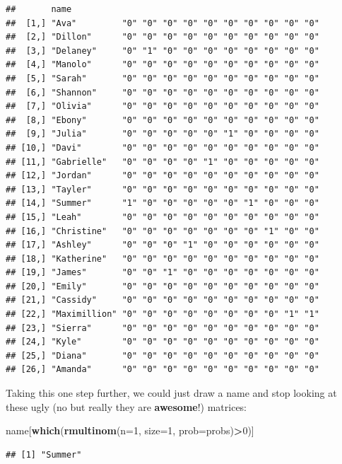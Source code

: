 \documentclass[
]{book}
\newenvironment{Shaded}{\begin{snugshade}}{\end{snugshade}}
\newcommand{\DataTypeTok}[1]{\textcolor[rgb]{0.13,0.29,0.53}{#1}}
\newcommand{\DecValTok}[1]{\textcolor[rgb]{0.00,0.00,0.81}{#1}}
\newcommand{\KeywordTok}[1]{\textcolor[rgb]{0.13,0.29,0.53}{\textbf{#1}}}
\newcommand{\NormalTok}[1]{#1}
\newcommand{\OperatorTok}[1]{\textcolor[rgb]{0.81,0.36,0.00}{\textbf{#1}}}
\begin{document}
\begin{verbatim}
##       name                                                 
##  [1,] "Ava"         "0" "0" "0" "0" "0" "0" "0" "0" "0" "0"
##  [2,] "Dillon"      "0" "0" "0" "0" "0" "0" "0" "0" "0" "0"
##  [3,] "Delaney"     "0" "1" "0" "0" "0" "0" "0" "0" "0" "0"
##  [4,] "Manolo"      "0" "0" "0" "0" "0" "0" "0" "0" "0" "0"
##  [5,] "Sarah"       "0" "0" "0" "0" "0" "0" "0" "0" "0" "0"
##  [6,] "Shannon"     "0" "0" "0" "0" "0" "0" "0" "0" "0" "0"
##  [7,] "Olivia"      "0" "0" "0" "0" "0" "0" "0" "0" "0" "0"
##  [8,] "Ebony"       "0" "0" "0" "0" "0" "0" "0" "0" "0" "0"
##  [9,] "Julia"       "0" "0" "0" "0" "0" "1" "0" "0" "0" "0"
## [10,] "Davi"        "0" "0" "0" "0" "0" "0" "0" "0" "0" "0"
## [11,] "Gabrielle"   "0" "0" "0" "0" "1" "0" "0" "0" "0" "0"
## [12,] "Jordan"      "0" "0" "0" "0" "0" "0" "0" "0" "0" "0"
## [13,] "Tayler"      "0" "0" "0" "0" "0" "0" "0" "0" "0" "0"
## [14,] "Summer"      "1" "0" "0" "0" "0" "0" "1" "0" "0" "0"
## [15,] "Leah"        "0" "0" "0" "0" "0" "0" "0" "0" "0" "0"
## [16,] "Christine"   "0" "0" "0" "0" "0" "0" "0" "1" "0" "0"
## [17,] "Ashley"      "0" "0" "0" "1" "0" "0" "0" "0" "0" "0"
## [18,] "Katherine"   "0" "0" "0" "0" "0" "0" "0" "0" "0" "0"
## [19,] "James"       "0" "0" "1" "0" "0" "0" "0" "0" "0" "0"
## [20,] "Emily"       "0" "0" "0" "0" "0" "0" "0" "0" "0" "0"
## [21,] "Cassidy"     "0" "0" "0" "0" "0" "0" "0" "0" "0" "0"
## [22,] "Maximillion" "0" "0" "0" "0" "0" "0" "0" "0" "1" "1"
## [23,] "Sierra"      "0" "0" "0" "0" "0" "0" "0" "0" "0" "0"
## [24,] "Kyle"        "0" "0" "0" "0" "0" "0" "0" "0" "0" "0"
## [25,] "Diana"       "0" "0" "0" "0" "0" "0" "0" "0" "0" "0"
## [26,] "Amanda"      "0" "0" "0" "0" "0" "0" "0" "0" "0" "0"
\end{verbatim}

Taking this one step further, we could just draw a name and stop looking at these ugly (no but really they are \textbf{awesome}!) matrices:

\begin{Shaded}
\begin{Highlighting}[]
\NormalTok{name[}\KeywordTok{which}\NormalTok{(}\KeywordTok{rmultinom}\NormalTok{(}\DataTypeTok{n=}\DecValTok{1}\NormalTok{, }\DataTypeTok{size=}\DecValTok{1}\NormalTok{, }\DataTypeTok{prob=}\NormalTok{probs)}\OperatorTok{>}\DecValTok{0}\NormalTok{)]}
\end{Highlighting}
\end{Shaded}

\begin{verbatim}
## [1] "Summer"
\end{verbatim}
\end{document}
